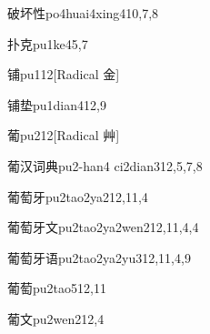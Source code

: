 \begin{verbete}{破坏性}{po4huai4xing4}{10,7,8}
\end{verbete}

\begin{verbete}{扑克}{pu1ke4}{5,7}
\end{verbete}

\begin{verbete}{铺}{pu1}{12}[Radical 金]
\end{verbete}

\begin{verbete}{铺垫}{pu1dian4}{12,9}
\end{verbete}

\begin{verbete}{葡}{pu2}{12}[Radical 艸]
\end{verbete}

\begin{verbete}{葡汉词典}{pu2-han4 ci2dian3}{12,5,7,8}
\end{verbete}

\begin{verbete}{葡萄牙}{pu2tao2ya2}{12,11,4}
\end{verbete}

\begin{verbete}{葡萄牙文}{pu2tao2ya2wen2}{12,11,4,4}
\end{verbete}

\begin{verbete}{葡萄牙语}{pu2tao2ya2yu3}{12,11,4,9}
\end{verbete}

\begin{verbete}{葡萄}{pu2tao5}{12,11}
\end{verbete}

\begin{verbete}{葡文}{pu2wen2}{12,4}
\end{verbete}

